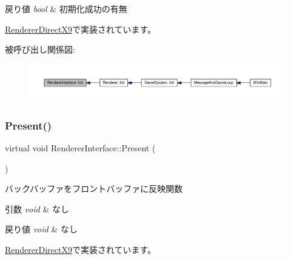 \begin{DoxyRetVals}{戻り値}
{\em bool} & 初期化成功の有無 \\
\hline
\end{DoxyRetVals}


\mbox{\hyperlink{class_renderer_direct_x9_af015676b50f3ce1ba7cf20abf6074e3b}{Renderer\+Direct\+X9}}で実装されています。

被呼び出し関係図\+:\nopagebreak
\begin{figure}[H]
\begin{center}
\leavevmode
\includegraphics[width=350pt]{class_renderer_interface_aabef76c27c2332c1af2dbcf7e8de5d38_icgraph}
\end{center}
\end{figure}
\mbox{\label{class_renderer_interface_aa9e12d2a2f5ffa351c457cfc7806b6f1}} 
\subsubsection{\texorpdfstring{Present()}{Present()}}
{\footnotesize\ttfamily virtual void Renderer\+Interface\+::\+Present (\begin{DoxyParamCaption}{ }\end{DoxyParamCaption})\hspace{0.3cm}{\ttfamily [pure virtual]}}



バックバッファをフロントバッファに反映関数 


\begin{DoxyParams}{引数}
{\em void} & なし \\
\hline
\end{DoxyParams}

\begin{DoxyRetVals}{戻り値}
{\em void} & なし \\
\hline
\end{DoxyRetVals}


\mbox{\hyperlink{class_renderer_direct_x9_a77dbc76e8adbe4f9ee41c5f09e5ebe81}{Renderer\+Direct\+X9}}で実装されています。

